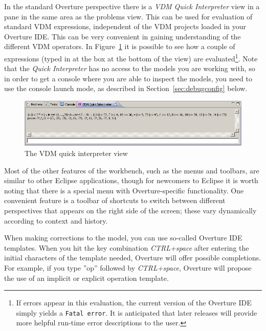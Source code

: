 In the standard Overture perspective there is a \emph{VDM Quick
  Interpreter} view in a pane in the same area as the problems
view. This can be used for evaluation of standard VDM expressions,
independent of the VDM projects loaded in your Overture
IDE. This can be very convenient in gaining understanding of the
different VDM operators. In Figure~\ref{fig:QuickIntView} it is
possible to see how a couple of expressions (typed in at the box at
the bottom of the view) are evaluated\footnote{If errors appear in
  this evaluation, the current version of the Overture IDE simply yields
  a \texttt{Fatal error}.  It is anticipated that later releases
  will provide more helpful run-time error descriptions to the user.}. Note that the \emph{Quick Interpreter} has no access to the models you are working with, so in order to get a console where you are able to inspect the models, you need to use the console launch mode, as described in Section~\ref{sec:debugconfig} below.

\begin{figure}[!htb]
\begin{center}
  \includegraphics[width=4.5in]{figures/quickinterpreter}
  \caption[labelInTOC]{The VDM quick interpreter view}
  \label{fig:QuickIntView}
\end{center}
\end{figure}

Most of the other features of the workbench, such as the menus and
toolbars, are similar to other Eclipse applications, though for
newcomers to Eclipse it is worth noting that there is a special menu
with Overture-specific functionality. One convenient feature is a
toolbar of shortcuts to switch between different perspectives that
appears on the right side of the screen; these vary dynamically
according to context and history.

When making corrections to the model, you can use so-called Overture IDE
templates. When you hit the key combination \textit{CTRL+space} after
entering the initial characters of the template needed, Overture will
offer possible completions. For example, if you type ''op'' followed by
\textit{CTRL+space}, Overture will propose the use of an implicit or
explicit operation template.

